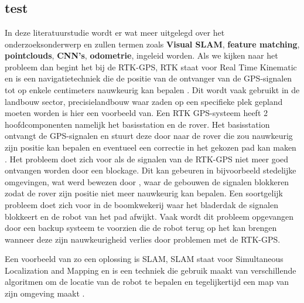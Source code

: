 \chapter{}%
\label{ch:stand-van-zaken}



\section{test}

In deze literatuurstudie wordt er wat meer uitgelegd over het onderzoeksonderwerp en zullen termen zoals \textbf{Visual SLAM}, \textbf{feature matching}, \textbf{pointclouds}, \textbf{CNN's}, \textbf{odometrie}, ingeleid worden.
Als we kijken naar het probleem dan begint het bij de RTK-GPS, RTK staat voor Real Time Kinematic en is een navigatietechniek die de positie van de ontvanger van de GPS-signalen tot op enkele centimeters nauwkeurig kan bepalen \autocite{8456505}.
Dit wordt vaak gebruikt in de landbouw sector, precisielandbouw waar zaden op een specifieke plek gepland moeten worden is hier een voorbeeld van.
Een RTK GPS-systeem heeft 2 hoofdcomponenten namelijk het basisstation en de rover.
Het basisstation ontvangt de GPS-signalen en stuurt deze door naar de rover die zou nauwkeurig zijn positie kan bepalen en eventueel een correctie in het gekozen pad kan maken \autocite{9249176}.
Het probleem doet zich voor als de signalen van de RTK-GPS niet meer goed ontvangen worden door een blockage.
Dit kan gebeuren in bijvoorbeeld stedelijke omgevingen, wat werd bewezen door \textcite{9210580}, waar de gebouwen de signalen blokkeren zodat de rover zijn positie niet meer nauwkeurig kan bepalen.
Een soortgelijk probleem doet zich voor in de boomkwekerij waar het bladerdak de signalen blokkeert en de robot van het pad afwijkt.
Vaak wordt dit probleem opgevangen door een backup systeem te voorzien die de robot terug op het kan brengen wanneer deze zijn nauwkeurigheid verlies door problemen met de RTK-GPS.

Een voorbeeld van zo een oplossing is SLAM, SLAM staat voor Simultaneous Localization and Mapping en is een techniek die gebruik maakt van verschillende algoritmen om de locatie van de robot te bepalen en tegelijkertijd een map van zijn omgeving maakt \autocite{SLAM}.

